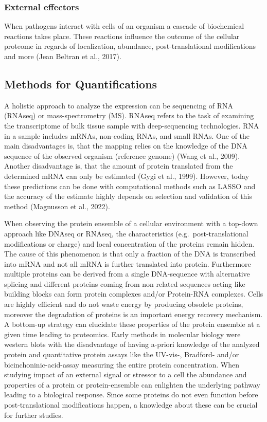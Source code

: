 \documentclass[
]{article}
\begin{document}
\hypertarget{external-effectors}{%
\subsubsection{External effectors}\label{external-effectors}}

When pathogens interact with cells of an organism a cascade of
biochemical reactions takes place. These reactions influence the outcome
of the cellular proteome in regards of localization, abundance,
post-translational modifications and more (Jean Beltran et al., 2017).

\hypertarget{methods-for-quantifications}{%
\subsection{Methods for
Quantifications}\label{methods-for-quantifications}}

A holistic approach to analyze the expression can be sequencing of RNA
(RNAseq) or mass-spectrometry (MS). RNAseq refers to the task of
examining the transcriptome of bulk tissue sample with deep-sequencing
technologies. RNA in a sample includes mRNAs, non-coding RNAs, and small
RNAs. One of the main disadvantages is, that the mapping relies on the
knowledge of the DNA sequence of the observed organism (reference
genome) (Wang et al., 2009). Another disadvantage is, that the amount of
protein translated from the determined mRNA can only be estimated (Gygi
et al., 1999). However, today these predictions can be done with
computational methods such as LASSO and the accuracy of the estimate
highly depends on selection and validation of this method (Magnusson et
al., 2022).

When observing the protein ensemble of a cellular environment with a
top-down approach like DNAseq or RNAseq, the characteristics
(e.g.~post-translational modifications or charge) and local
concentration of the proteins remain hidden. The cause of this
phenomenon is that only a fraction of the DNA is transcribed into mRNA
and not all mRNA is further translated into protein. Furthermore
multiple proteins can be derived from a single DNA-sequence with
alternative splicing and different proteins coming from non related
sequences acting like building blocks can form protein complexes and/or
Protein-RNA complexes. Cells are highly efficient and do not waste
energy by producing obsolete proteins, moreover the degradation of
proteins is an important energy recovery mechanism. A bottom-up strategy
can elucidate these properties of the protein ensemble at a given time
leading to proteomics. Early methods in molecular biology were western
blots with the disadvantage of having a-priori knowledge of the analyzed
protein and quantitative protein assays like the UV-vis-, Bradford-
and/or bicinchoninic-acid-assay measuring the entire protein
concentration. When studying impact of an external signal or stressor to
a cell the abundance and properties of a protein or protein-ensemble can
enlighten the underlying pathway leading to a biological response. Since
some proteins do not even function before post-translational
modifications happen, a knowledge about these can be crucial for further
studies.
\end{document}
